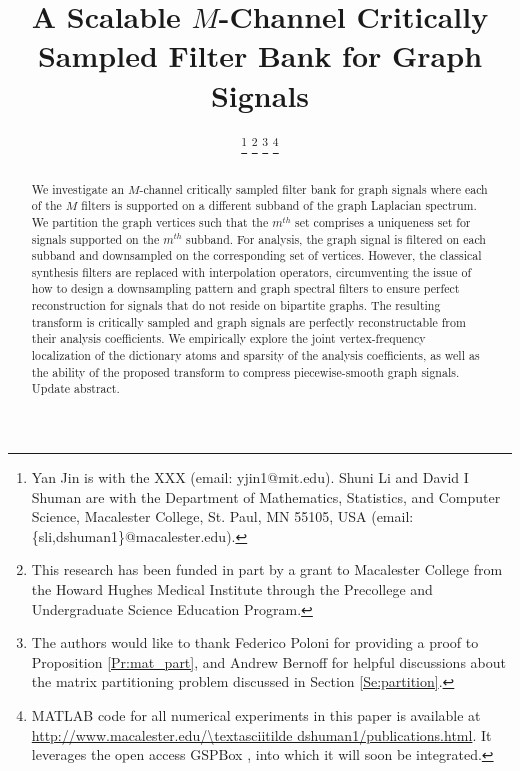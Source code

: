 \documentclass[journal, 10pt]{IEEEtran}
\begin{document}
\title{
A Scalable $M$-Channel Critically Sampled Filter Bank for Graph Signals 
}
\author{
\thanks{Yan Jin is with the {\color{red}XXX (email: yjin1@mit.edu)}. Shuni Li and David I Shuman are with the Department of Mathematics, Statistics, and Computer Science, Macalester College, St. Paul, MN 55105, USA (email: \{sli,dshuman1\}@macalester.edu).  }
\thanks{This research has been funded in part by a grant to Macalester College from the Howard Hughes Medical Institute through the Precollege and Undergraduate Science Education Program.}
\thanks{The authors would like to thank Federico Poloni for providing a proof to Proposition \ref{Pr:mat_part}, and Andrew Bernoff for helpful discussions about the matrix partitioning problem discussed in Section \ref{Se:partition}.}
\thanks{MATLAB code for all numerical experiments in this paper is available at \url{http://www.macalester.edu/\textasciitilde dshuman1/publications.html}. It leverages the open access GSPBox \cite{gspbox}, into which it will soon be integrated.}}

\maketitle

\begin{abstract}
We investigate an $M$-channel critically sampled filter bank for graph signals where each of the $M$ filters is supported on a different subband of the graph Laplacian spectrum. We partition the graph vertices such that the $m^{th}$ set comprises a uniqueness set for signals supported on the $m^{th}$ subband. For analysis, the graph signal is filtered on each subband and downsampled on the corresponding set of vertices. However, the classical synthesis filters are replaced with interpolation operators, circumventing the issue of how to design a downsampling pattern and graph spectral filters to ensure perfect reconstruction for signals that do not reside on bipartite graphs. The resulting transform is critically sampled and graph signals are perfectly reconstructable from their analysis coefficients. We empirically explore the joint vertex-frequency localization of the dictionary atoms and sparsity of the analysis coefficients, as well as the ability of the proposed transform to compress 
piecewise-smooth graph signals. {\color{red} Update abstract.}
\end{abstract}
\end{document}
